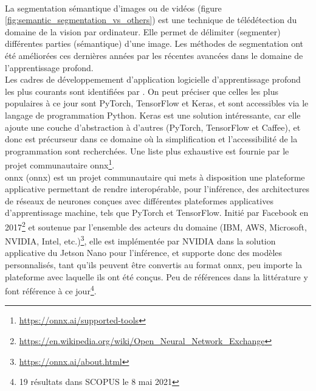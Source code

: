 \vspace{0.5\baselineskip}
\\
\noindent La segmentation sémantique d'images ou de vidéos (figure \ref{fig:semantic_segmentation_vs_others}) est une technique de télédétection du domaine de la vision par ordinateur. Elle permet de délimiter (segmenter) différentes parties (sémantique) d'une image. Les méthodes de segmentation ont été améliorées ces dernières années par les récentes avancées dans le domaine de l'apprentissage profond. 
\vspace{0.5\baselineskip}
\\
\noindent Les cadres de développemement d'application logicielle d'apprentissage profond les plus courants sont identifiées par \parencite{cornioley_integration_2018}. On peut préciser que celles les plus populaires à ce jour sont PyTorch, TensorFlow et Keras, et sont accessibles via le langage de programmation Python. Keras est une solution intéressante, car elle ajoute une couche d'abstraction à d'autres (PyTorch, TensorFlow et Caffee), et donc est précurseur dans ce domaine où la simplification et l'accessibilité de la programmation sont recherchées. Une liste plus exhaustive est fournie par le projet communautaire \acrshort{onnx}\footnote{\url{https://onnx.ai/supported-tools}}.
\vspace{0.5\baselineskip}
\\
\noindent \acrshort{onnx} (\acrlong{onnx}) est un projet communautaire qui mets à disposition une plateforme applicative permettant de rendre interopérable, pour l'inférence, des architectures de réseaux de neurones conçues avec différentes plateformes applicatives d'apprentissage machine, tels que PyTorch et TensorFlow. Initié par Facebook en 2017\footnote{\url{https://en.wikipedia.org/wiki/Open_Neural_Network_Exchange}} et soutenue par l'ensemble des acteurs du domaine (IBM, AWS, Microsoft, NVIDIA, Intel, etc.)\footnote{\url{https://onnx.ai/about.html}}, elle est implémentée par NVIDIA dans la solution applicative du Jetson Nano pour l'inférence, et supporte donc des modèles personnalisés, tant qu'ils peuvent être convertis au format \acrshort{onnx}, peu importe la plateforme avec laquelle ils ont été conçus. Peu de références dans la littérature y font référence à ce jour\footnote{19 résultats dans SCOPUS le 8 mai 2021}.